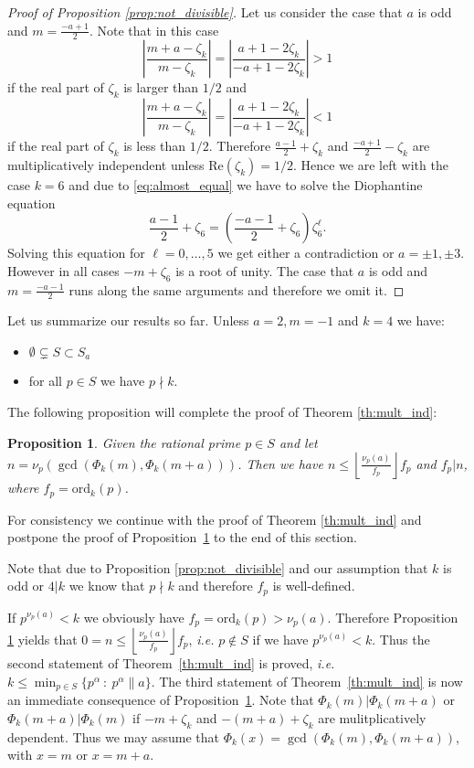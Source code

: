 \documentclass{amsart}
\theoremstyle{plain}
\numberwithin{equation}{section}
\newtheorem{proposition}[thm]{Proposition}
\theoremstyle{remark}
\begin{document}
\begin{proof}[Proof of Proposition \ref{prop:not_divisible}]
Let us consider the case that $a$ is odd and $m=\frac{-a+1}2$. Note that in
this case 
$$\left|\frac{m+a-\zeta_k}{m-\zeta_k}\right|=\left|\frac{a+1-2\zeta_k}{-a+1-2\zeta_k}\right| >1$$
if the real
part of $\zeta_k$ is larger than $1/2$ and
$$\left|\frac{m+a-\zeta_k}{m-\zeta_k}\right|=\left|\frac{a+1-2\zeta_k}{-a+1-2\zeta_k}\right|<1$$
if the real part of
$\zeta_k$ is less than $1/2$. Therefore $\frac{a-1}2+\zeta_k$ and
$\frac{-a+1}2-\zeta_k$ are multiplicatively independent unless
${\mathrm{Re}}(\zeta_k)= 1/2$. Hence we are left with the case $k=6$ and due to \eqref{eq:almost_equal} we have to
solve the Diophantine equation
$$\frac{a-1}2+\zeta_6=\left(\frac{-a-1}2+\zeta_6\right)\zeta_6^\ell.$$
Solving this equation for $\ell=0,\dots,5$ we get either a
contradiction or $a=\pm 1, \pm 3$. However in all cases $-m+\zeta_6$ is
a root of unity.  The case that $a$ is odd and $m=\frac{-a-1}2$ runs
along the same arguments and therefore we omit it.
\end{proof}

Let us summarize our results so far. Unless $a=2, m=-1$ and $k=4$ we have:
\begin{itemize}
 \item $\emptyset\subsetneq S \subset S_a$
 \item for all $p\in S$ we have $p\nmid k$.
\end{itemize}

The following proposition will complete the proof of Theorem \ref{th:mult_ind}:

\begin{proposition}\label{prop:res_class_deg}
Given the rational prime $p\in S$ and let $n=\nu_p\left( \gcd(\Phi_k(m),\Phi_k(m+a))\right)$. Then we have $n\leq \left\lfloor \frac{\nu_p(a)}{f_p} 
\right\rfloor f_p$ and $f_p|n$, where $f_p={\mathrm{ord}}_k(p)$.
\end{proposition}

For consistency we continue with the proof of Theorem
\ref{th:mult_ind} and postpone the proof of
Proposition~\ref{prop:res_class_deg} to the end of this section.

Note that due to Proposition \ref{prop:not_divisible} and our assumption that $k$ is odd or $4|k$ we know that $p\nmid k$ and therefore $f_p$ is well-defined.

If $p^{\nu_p(a)} < k$ we obviously have $f_p={\mathrm{ord}}_{k}(p)>\nu_p(a)$. Therefore Proposition \ref{prop:res_class_deg} yields that
$0=n\leq \left\lfloor \frac{\nu_p(a)}{f_p} \right\rfloor f_p$, \textit{i.e.} $p\not \in S$ if we have 
$p^{\nu_p(a)} < k$. Thus the second statement of Theorem~\ref{th:mult_ind} is proved, \textit{i.e.} $k\leq \min_{p\in S}\{p^\alpha\: :\: p^\alpha \| a\}$.
The third statement of Theorem~\ref{th:mult_ind} is now an immediate consequence of
Proposition~\ref{prop:res_class_deg}. Note that $\Phi_k(m)|\Phi_k(m+a)$ or $\Phi_k(m+a)|\Phi_k(m)$ if $-m+\zeta_k$ and $-(m+a)+\zeta_k$ are mulitplicatively 
dependent. Thus we may assume that $\Phi_k(x)=\gcd(\Phi_k(m),\Phi_k(m+a))$, with $x=m$ or $x=m+a$.
\end{document}
